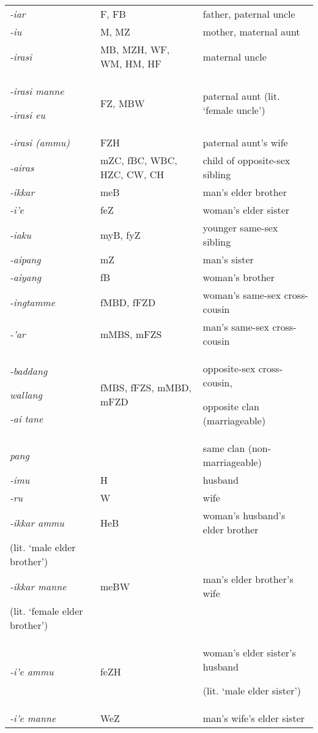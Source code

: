 \begin{table}\centering


\begin{tabular}{p{3cm}p{3cm}p{5cm}}

\textit{{}-iar} & F, FB & father, paternal uncle\\
\textit{{}-iu} & M, MZ & mother, maternal aunt\\
\textit{{}-irasi} & MB, MZH, WF, WM, HM, HF & maternal uncle\\
\textit{{}-irasi manne}

\textit{{}-irasi eu} & FZ, MBW & paternal aunt (lit. `female uncle')\\
\textit{{}-irasi (ammu)} & FZH & paternal aunt's wife\\
\textit{{}-airas} & mZC, fBC, WBC, HZC, CW, CH & child of opposite-sex sibling\\
\textit{{}-ikkar} & meB & man's elder brother\\
\textit{{}-i'e} & feZ & woman's elder sister\\
\textit{{}-iaku} & myB, fyZ & younger same-sex sibling\\
\textit{{}-aipang} & mZ & man's sister\\
\textit{{}-aiyang} & fB & woman's brother\\
\textit{{}-ingtamme} & fMBD, fFZD & woman's same-sex cross-cousin\\
\textit{{}-'ar} & mMBS, mFZS & man's same-sex cross-cousin\\
\textit{{}-baddang}

\textit{wallang}

\textit{{}-ai tane} & fMBS, fFZS, mMBD, mFZD & opposite-sex cross-cousin,

opposite clan (marriageable)\\
\textit{pang} &  & same clan (non-marriageable)\\
\textit{{}-imu} & H & husband\\
\textit{{}-ru} & W & wife\\
\textit{{}-ikkar ammu} & HeB & woman's husband's elder brother \\
(lit. `male elder brother')\\
\textit{{}-ikkar manne} & meBW & man's elder brother's wife \\
(lit. `female elder brother')\\
\textit{{}-i'e ammu} & feZH & woman's elder sister's husband

(lit. `male elder sister')\\
\textit{{}-i'e manne} & WeZ & man's wife's elder sister


\end{tabular}
\end{table}
